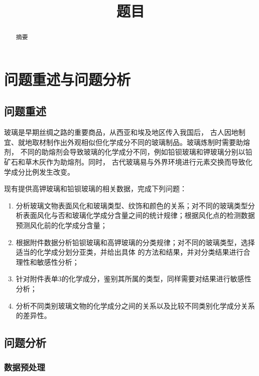 \documentclass[withoutpreface,bwprint]{cumcmthesis} %
\title{题目}
\begin{document}
	
	\maketitle
	\begin{abstract}
		摘要
		
		
		\quad
		
		
\end{abstract}


\setcounter{page}{1}    

\section{问题重述与问题分析}
\subsection{问题重述}
玻璃是早期丝绸之路的重要商品，从西亚和埃及地区传入我国后， 古人因地制宜、就地取材制作出外观相似但化学成分不同的玻璃制品。玻璃炼制时需要助熔剂， 不同的助熔剂会导致玻璃的化学成分不同，例如铅钡玻璃和钾玻璃分别以铅矿石和草木灰作为助熔剂。同时， 古代玻璃易与外界环境进行元素交换而导致化学成分比例发生改变。


现有提供高钾玻璃和铅钡玻璃的相关数据，完成下列问题：


\begin{enumerate}
	\item 分析玻璃文物表面风化和玻璃类型、纹饰和颜色的关系；对不同的玻璃类型分析表面风化与否和玻璃化学成分含量之间的统计规律；根据风化点的检测数据预测风化前的化学成分含量；
	\item 根据附件数据分析铅钡玻璃和高钾玻璃的分类规律；对不同的玻璃类型，选择适当的化学成分划分亚类，并给出具体 的方法和结果，并对分类结果进行合理性和敏感性分析；
	\item 针对附件表单3的化学成分，鉴别其所属的类型，同样需要对结果进行敏感性分析；
	\item 分析不同类别玻璃文物的化学成分之间的关系以及比较不同类别化学成分关系的差异性。
\end{enumerate}


\subsection{问题分析}

\subsubsection{数据预处理}
\end{document}
